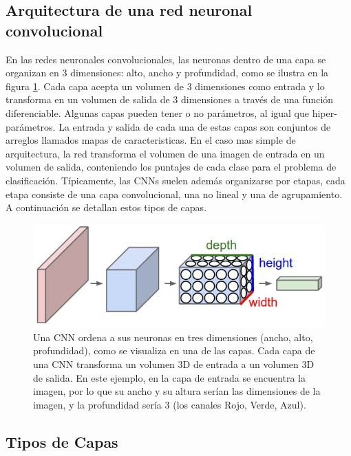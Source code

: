 \documentclass[a4paper,11pt,spanish]{book}
\begin{document}
    \subsection {Arquitectura de una red neuronal convolucional}
      En las redes neuronales convolucionales, las neuronas dentro de una capa se organizan en 3 dimensiones: alto, ancho y profundidad, como se ilustra en la figura \ref{fig:cnn}.
      Cada capa acepta un volumen de 3 dimensiones como entrada y lo transforma en un volumen de salida de 3 dimensiones a través de una función diferenciable.
      Algunas capas pueden tener o no parámetros, al igual que hiper-parámetros. La entrada y salida de cada una de estas capas son conjuntos de arreglos llamados mapas de caracteristicas.
      En el caso mas simple de arquitectura, la red transforma el volumen de una imagen de entrada en un volumen de salida, conteniendo los puntajes de cada clase para el problema de clasificación.
      Típicamente, las CNNs suelen además organizarse por etapas, cada etapa consiste de una capa convolucional, una no lineal y una de agrupamiento.
      A continuación se detallan estos tipos de capas.
      \begin{figure}[H]
	\begin{center}
	\includegraphics[width=0.8\linewidth]{./img/stanford_cnn.jpeg}
	\end{center}
	\caption{Una CNN ordena a sus neuronas en tres dimensiones (ancho, alto, profundidad), como se visualiza en una de
	  las capas. Cada capa de una CNN transforma un volumen 3D de entrada a un volumen 3D de salida. En este ejemplo, en la capa de entrada se encuentra la imagen, por lo que su ancho y su altura
	  serían las dimensiones de la imagen, y la profundidad sería 3 (los canales Rojo, Verde, Azul). \cite{Karpathy:Stanford}}
	\label{fig:cnn}
      \end{figure}
      
    \subsection {Tipos de Capas}
\end{document}

